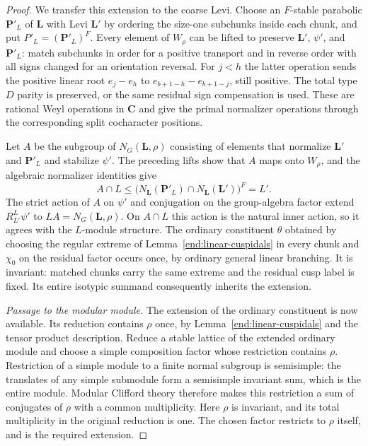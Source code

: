 \begin{proof}
We transfer this extension to the coarse Levi.  Choose an $F$-stable
parabolic $\mathbf P'_L$ of $\mathbf L$ with Levi $\mathbf L'$
by ordering the size-one subchunks inside each chunk, and put
$P'_L=(\mathbf P'_L)^F$.  Every element of $W_\rho$ can be
lifted to preserve $\mathbf L'$, $\psi'$, and $\mathbf P'_L$: match subchunks in
order for a positive transport and in reverse order with all
signs changed for an orientation reversal.  For $j<h$ the latter
operation sends the positive linear root $e_j-e_h$ to
$e_{b+1-h}-e_{b+1-j}$, still positive.  The total type $D$ parity
is preserved, or the same residual sign compensation is used.
These are rational Weyl operations in $\mathbf C$ and give the
primal normalizer operations through the corresponding split
cocharacter positions.

Let $A$ be the subgroup of $N_G(\mathbf L,\rho)$ consisting of
elements that normalize $\mathbf L'$ and $\mathbf P'_L$ and
stabilize $\psi'$.  The preceding lifts show that $A$ maps onto
$W_\rho$, and the algebraic normalizer identities give
\[
 A\cap L\leq
 \bigl(N_{\mathbf L}(\mathbf P'_L)
       \cap N_{\mathbf L}(\mathbf L')\bigr)^F=L'.
\]
The strict action of $A$ on $\psi'$ and
conjugation on the group-algebra factor extend $R_{L'}^L\psi'$
to $LA=N_G(\mathbf L,\rho)$.  On $A\cap L$ this action is the natural
inner action, so it agrees with the $L$-module structure.
The ordinary constituent $\theta$ obtained by choosing the
regular extreme of Lemma~\ref{end:linear-cuspidals} in every
chunk and $\chi_0$ on the residual factor occurs once, by
ordinary general linear branching.  It is invariant: matched
chunks carry the same extreme and the residual cusp label is
fixed.  Its entire isotypic summand consequently inherits the
extension.

\smallskip\noindent\emph{Passage to the modular module.}
The extension of the ordinary constituent is now available.
Its reduction contains $\rho$ once, by
Lemma~\ref{end:linear-cuspidals} and the tensor product
description.  Reduce a stable lattice of the extended ordinary
module and choose a simple composition factor whose restriction
contains $\rho$.  Restriction of a simple module to a finite
normal subgroup is semisimple: the translates of any simple
submodule form a semisimple invariant sum, which is the entire
module.  Modular Clifford theory therefore makes this
restriction a sum of conjugates of $\rho$ with a common
multiplicity.  Here $\rho$ is invariant, and its total
multiplicity in the original reduction is one.  The chosen
factor restricts to $\rho$ itself, and is the required extension.
\end{proof}

